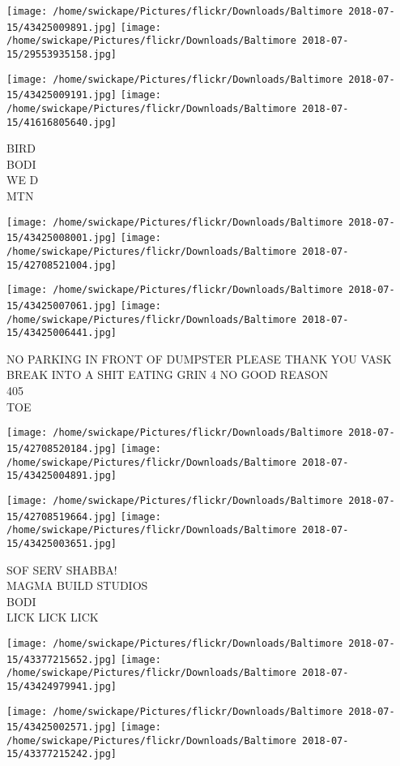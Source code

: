 \documentclass[10pt,letterpaper]{article}
\begin{document}
\texttt{[image: /home/swickape/Pictures/flickr/Downloads/Baltimore 2018-07-15/43425009891.jpg]}
\texttt{[image: /home/swickape/Pictures/flickr/Downloads/Baltimore 2018-07-15/29553935158.jpg]}

\texttt{[image: /home/swickape/Pictures/flickr/Downloads/Baltimore 2018-07-15/43425009191.jpg]}
\texttt{[image: /home/swickape/Pictures/flickr/Downloads/Baltimore 2018-07-15/41616805640.jpg]}

BIRD\\
BODI\\
WE D\\
MTN
\pagebreak

\texttt{[image: /home/swickape/Pictures/flickr/Downloads/Baltimore 2018-07-15/43425008001.jpg]}
\texttt{[image: /home/swickape/Pictures/flickr/Downloads/Baltimore 2018-07-15/42708521004.jpg]}

\texttt{[image: /home/swickape/Pictures/flickr/Downloads/Baltimore 2018-07-15/43425007061.jpg]}
\texttt{[image: /home/swickape/Pictures/flickr/Downloads/Baltimore 2018-07-15/43425006441.jpg]}

NO PARKING IN FRONT OF DUMPSTER PLEASE THANK YOU VASK\\
BREAK INTO A SHIT EATING GRIN 4 NO GOOD REASON\\
405\\
TOE
\pagebreak

\texttt{[image: /home/swickape/Pictures/flickr/Downloads/Baltimore 2018-07-15/42708520184.jpg]}
\texttt{[image: /home/swickape/Pictures/flickr/Downloads/Baltimore 2018-07-15/43425004891.jpg]}

\texttt{[image: /home/swickape/Pictures/flickr/Downloads/Baltimore 2018-07-15/42708519664.jpg]}
\texttt{[image: /home/swickape/Pictures/flickr/Downloads/Baltimore 2018-07-15/43425003651.jpg]}

SOF SERV SHABBA!\\
MAGMA BUILD STUDIOS\\
BODI\\
LICK LICK LICK
\pagebreak

\texttt{[image: /home/swickape/Pictures/flickr/Downloads/Baltimore 2018-07-15/43377215652.jpg]}
\texttt{[image: /home/swickape/Pictures/flickr/Downloads/Baltimore 2018-07-15/43424979941.jpg]}

\texttt{[image: /home/swickape/Pictures/flickr/Downloads/Baltimore 2018-07-15/43425002571.jpg]}
\texttt{[image: /home/swickape/Pictures/flickr/Downloads/Baltimore 2018-07-15/43377215242.jpg]}
\end{document}
